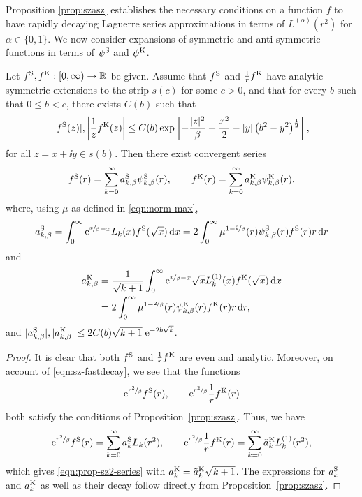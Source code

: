 Proposition \ref{prop:szasz} establishes the necessary conditions on a function $f$ to have rapidly decaying
Laguerre series approximations in terms of $L^{(\alpha)}(r^2)$ for $\alpha\in\{0,1\}$. We now consider
expansions of symmetric and anti-symmetric functions in terms of $\psi^{\mathrm{S}}$ and $\psi^{\mathrm{K}}$.

\begin{proposition} \label{prop:sz2}
Let $f^{\mathrm{S}}, f^{\mathrm{K}}: [0,\infty) \to \mathbb{R}$ be given. Assume that $f^{\mathrm{S}}$ and $\frac{1}{r}f^{\mathrm{K}}$ have analytic
symmetric extensions to the strip $s(c)$ for some $c>0$, and that for every $b$ such that $0\leq b<c$, there
exists $C(b)$ such that 
\begin{equation} \label{eqn:sz-fastdecay}
    |f^{\mathrm{S}}(z)|, \left|\frac{1}{z}f^{\mathrm{K}}(z)\right| \leq C(b) 
    \exp\left[-\frac{|z|^2}{\beta}+\frac{x^2}{2} - |y|\left(b^2 - y^2\right)^{\frac{1}{2}}\right],
\end{equation}
for all $z=x+\ii y \in s(b)$. Then there exist convergent series
\begin{equation} \label{eqn:prop-sz2-series}
    f^{\mathrm{S}}(r) = \sum_{k=0}^\infty a^{\mathrm{S}}_{k,\beta} \psi^{\mathrm{S}}_{k,\beta}(r), \qquad
    f^{\mathrm{K}}(r) = \sum_{k=0}^\infty a^{\mathrm{K}}_{k,\beta} \psi^{\mathrm{K}}_{k,\beta}(r),
\end{equation}
where, using $\mu$ as defined in \eqref{eqn:norm-max},
\begin{equation*}
    a^{\mathrm{S}}_{k,\beta} = \int_0^\infty \mathrm{e}^{\nicefrac{x}{\beta}-x} L_k(x) f^{\mathrm{S}}(\sqrt{x}) \,\mathrm{d} x 
             = 2\int_0^\infty \mu^{1-\nicefrac{2}{\beta}}(r) \psi^{\mathrm{S}}_{k,\beta}(r) f^{\mathrm{S}}(r) r \,\mathrm{d} r \\
\end{equation*}
and
\begin{align*}
    a^{\mathrm{K}}_{k,\beta} 
        &= \frac{1}{\sqrt{k+1}} \int_0^\infty \mathrm{e}^{\nicefrac{x}{\beta}-x} 
                        \sqrt{x} L^{(1)}_k(x) f^{\mathrm{K}}(\sqrt{x}) \,\mathrm{d} x \\
        &= 2\int_0^\infty \mu^{1-\nicefrac{2}{\beta}}(r) \psi^{\mathrm{K}}_{k,\beta}(r) f^{\mathrm{K}}(r) r \,\mathrm{d} r,
\end{align*}
and $|a^{\mathrm{S}}_{k,\beta}|, |a^{\mathrm{K}}_{k,\beta}| \leq 2C(b)\sqrt{k+1}\;\mathrm{e}^{-2b\sqrt{k}}$.
\end{proposition}
\begin{proof}
It is clear that both $f^{\mathrm{S}}$ and $\frac{1}{r}f^{\mathrm{K}}$ are even and analytic. Moreover, on account of
\eqref{eqn:sz-fastdecay}, we see that the functions
\[
    \mathrm{e}^{\nicefrac{r^2}{\beta}}f^{\mathrm{S}}(r),\qquad \mathrm{e}^{\nicefrac{r^2}{\beta}}\frac{1}{r}f^{\mathrm{K}}(r)
\]
both satisfy the conditions of Proposition~\ref{prop:szasz}. Thus, we have
\[
    \mathrm{e}^{\nicefrac{r^2}{\beta}} f^{\mathrm{S}}(r) = \sum_{k=0}^\infty a^{\mathrm{S}}_k L_k(r^2), \qquad
    \mathrm{e}^{\nicefrac{r^2}{\beta}} \frac{1}{r} f^{\mathrm{K}}(r) = \sum_{k=0}^\infty \tilde{a}^{\mathrm{K}}_k L^{(1)}_k(r^2),
\]
which gives \eqref{eqn:prop-sz2-series} with $a^{\mathrm{K}}_k = \tilde{a}^{\mathrm{K}}_k\sqrt{k+1}$. The expressions for
$a^{\mathrm{S}}_k$ and $a^{\mathrm{K}}_k$ as well as their decay follow directly from Proposition~\ref{prop:szasz}.
\end{proof}
